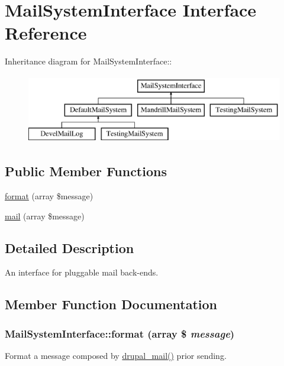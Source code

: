 \hypertarget{interfaceMailSystemInterface}{
\section{MailSystemInterface Interface Reference}
\label{interfaceMailSystemInterface}
}
Inheritance diagram for MailSystemInterface::\begin{figure}[H]
\begin{center}
\leavevmode
\includegraphics[height=3cm]{interfaceMailSystemInterface}
\end{center}
\end{figure}
\subsection*{Public Member Functions}
\begin{DoxyCompactItemize}
\item 
\hyperlink{interfaceMailSystemInterface_a430f4c9b4c5f3825f6a9ec73e7b5e5d6}{format} (array \$message)
\item 
\hyperlink{interfaceMailSystemInterface_a8dd560f7879b93d1fd3497b27a3b08f7}{mail} (array \$message)
\end{DoxyCompactItemize}


\subsection{Detailed Description}
An interface for pluggable mail back-\/ends. 

\subsection{Member Function Documentation}
\hypertarget{interfaceMailSystemInterface_a430f4c9b4c5f3825f6a9ec73e7b5e5d6}{
\subsubsection[{format}]{\setlength{\rightskip}{0pt plus 5cm}MailSystemInterface::format (array \$ {\em message})}}
\label{interfaceMailSystemInterface_a430f4c9b4c5f3825f6a9ec73e7b5e5d6}
Format a message composed by \hyperlink{mail_8inc_ab80781fd7273975a77cbbd13300eddbf}{drupal\_\-mail()} prior sending.


